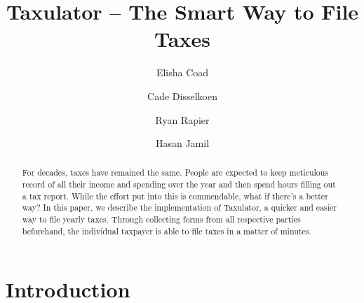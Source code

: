 \documentclass[sigconf]{acmart}
\begin{document}
\title{Taxulator – The Smart Way to File Taxes}

\author{Elisha Coad}

\author{Cade Disselkoen}

\author{Ryan Rapier}

\author{Hasan Jamil}


\begin{abstract}
  For decades, taxes have remained the same. People are expected to keep meticulous record of all their income and spending over the year and then spend hours filling out a tax report. While the effort put into this is commendable, what if there’s a better way? In this paper, we describe the implementation of Taxulator, a quicker and easier way to file yearly taxes. Through collecting forms from all respective parties beforehand, the individual taxpayer is able to file taxes in a matter of minutes.
\end{abstract}



\maketitle

\section{Introduction}
\end{document}

